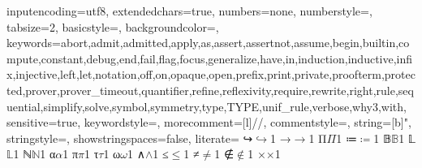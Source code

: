 
{
  inputencoding=utf8,
  extendedchars=true,
  numbers=none,
  numberstyle={},
  tabsize=2,
  basicstyle={\ttfamily\small\upshape},
  backgroundcolor=\color{lightgrey},
  keywords={abort,admit,admitted,apply,as,assert,assertnot,assume,begin,builtin,compute,constant,debug,end,fail,flag,focus,generalize,have,in,induction,inductive,infix,injective,left,let,notation,off,on,opaque,open,prefix,print,private,proofterm,protected,prover,prover_timeout,quantifier,refine,reflexivity,require,rewrite,right,rule,sequential,simplify,solve,symbol,symmetry,type,TYPE,unif_rule,verbose,why3,with},
  sensitive=true,
  keywordstyle=\color{blue},
  morecomment=[l]{//},
  commentstyle={\itshape\color{red}},
  string=[b]{"},
  stringstyle=\color{orange},
  showstringspaces=false,
  literate=
  {↪}{$\hookrightarrow$}1
  {→}{$\rightarrow$}1
  {Π}{$\Pi$}1
  {≔}{$\coloneqq$}1
  {𝔹}{$\mathbb{B}$}1
  {𝕃}{$\mathbb{L}$}1
  {ℕ}{$\mathbb{N}$}1
  {α}{$\alpha$}1
  {π}{$\pi$}1
  {τ}{$\tau$}1
  {ω}{$\omega$}1
  {∧}{$\wedge$}1
  {≤}{$\le$}1
  {≠}{$\neq$}1
  {∉}{$\notin$}1
  {×}{$\times$}1
}
